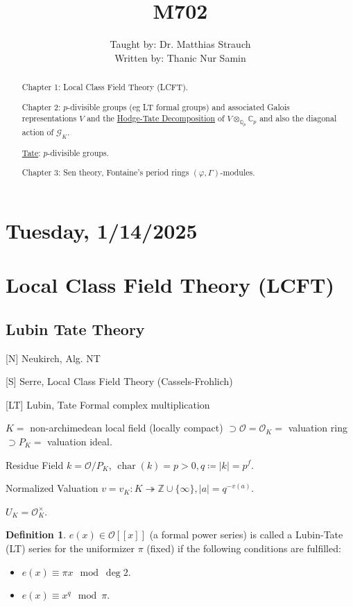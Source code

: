 \documentclass{article}
\title{M702}
\author{Taught by: Dr. Matthias Strauch \\ Written by: Thanic Nur Samin}
\date{\vspace{-5ex}}
\theoremstyle{definition}
\newtheorem*{definition}{Definition}
\numberwithin{theorem}{subsection}
\begin{document}
    \maketitle

    \section*{Tuesday, 1/14/2025}

    \begin{abstract}
        Chapter 1: Local Class Field Theory (LCFT).

        Chapter 2: \(p\)-divisible groups (eg LT formal groups) and associated Galois representations \(V\) and the \underline{Hodge-Tate Decomposition} of \(V \otimes_{\mathbb{Q}_p}\mathbb{C}_p\) and also the diagonal action of \(\mathscr{G}_K\).

        \underline{Tate}: \(p\)-divisible groups.

        Chapter 3: Sen theory, Fontaine's period rings \((\varphi, \Gamma)\)-modules.


    \end{abstract}
    
    \section{Local Class Field Theory (LCFT)}

    \subsection{Lubin Tate Theory}

    [N] Neukirch, Alg. NT
    
    [S] Serre, Local Class Field Theory (Cassels-Frohlich)

    [LT] Lubin, Tate Formal complex multiplication

    \(K =\)  non-archimedean local field (locally compact) \(\supset \mathcal{O} = \mathcal{O}_K =\) valuation ring \(\supset P_K =\) valuation ideal.

    Residue Field \(k = \mathcal{O} / P_K\), \(\operatorname{char} (k) = p > 0, q \coloneqq \vert k \vert = p^f\).

    Normalized Valuation \(v = v_K : K \twoheadrightarrow \mathbb{Z} \cup \{ \infty \}, \vert a \vert = q^{-v(a)}\).
    
    \(U_K = \mathcal{O}_K^\times\).

    \begin{definition}
        \(e(x) \in \mathcal{O} [[x]]\) (a formal power series) is called a Lubin-Tate (LT) series for the uniformizer \(\pi\) (fixed) if the following conditions are fulfilled:

        \begin{itemize}
            \item \(e(x) \equiv \pi x \mod\deg 2\).
            \item \(e(x) \equiv x^q \mod \pi\). 
        \end{itemize} 
    \end{definition}
\end{document}
